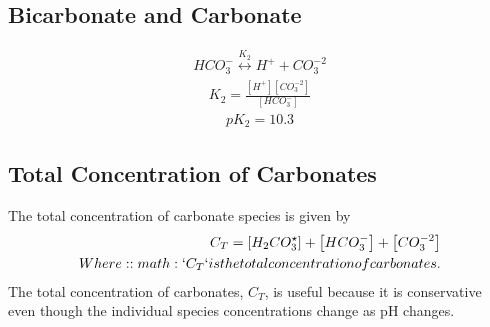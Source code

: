 \documentclass[letterpaper,10pt,english]{sphinxmanual}
\begin{document}
\subsection{Bicarbonate and Carbonate}
\label{\detokenize{Rapid_Mix/RM_Derivations:bicarbonate-and-carbonate}}\label{\detokenize{Rapid_Mix/RM_Derivations:heading-bicarbonate-and-carbonate}}\begin{equation}\label{equation:Rapid_Mix/RM_Derivations:Rapid_Mix/RM_Derivations:2}
\begin{split}HCO_3^ - \overset {{K_2}} \longleftrightarrow {H^ + } + CO_3^{ - 2}\end{split}
\end{equation}\begin{equation}\label{equation:Rapid_Mix/RM_Derivations:Rapid_Mix/RM_Derivations:3}
\begin{split}{K_2} = \frac{{\left[ {{H^ + }} \right]\left[ {CO_3^{ - 2}} \right]}}{{\left[ {HCO_3^ - } \right]}}\end{split}
\end{equation}\begin{equation}\label{equation:Rapid_Mix/RM_Derivations:Rapid_Mix/RM_Derivations:4}
\begin{split}p{K_2} = 10.3\end{split}
\end{equation}

\subsection{Total Concentration of Carbonates}
\label{\detokenize{Rapid_Mix/RM_Derivations:total-concentration-of-carbonates}}\label{\detokenize{Rapid_Mix/RM_Derivations:heading-total-concentration-of-carbonates}}
The total concentration of carbonate species is given by
\begin{align}\label{equation:Rapid_Mix/RM_Derivations:Rapid_Mix/RM_Derivations:5}\!\begin{aligned}
{C_T} = \left[ {{H_2}CO_3^{\star} } \right] + \left[ {HCO_3^ - } \right] + \left[ {CO_3^{ - 2}} \right]\\
Where: :math:`{C_T}` is the total concentration of carbonates.\\
\end{aligned}\end{align}
The total concentration of carbonates, \({C_T}\), is useful because it is conservative even though the individual species concentrations change as pH changes.
\end{document}
